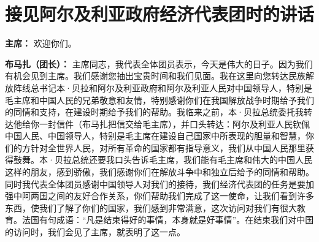 \section[接见阿尔及利亚政府经济代表团时的讲话（一九六四年九月二十日）]{接见阿尔及利亚政府经济代表团时的讲话}

\begin{list}{}{
    \setlength{\topsep}{0pt}        %
    \setlength{\partopsep}{0pt}     %
    \setlength{\parsep}{\parskip}   %
    \setlength{\itemsep}{\lineskip}       %
    \setlength{\labelsep}{0pt}%
    \setlength{\labelwidth}{3em}%
    \setlength{\itemindent}{0pt}%
    \setlength\listparindent{\parindent}
    \setlength{\leftmargin}{3em}
    \setlength{\rightmargin}{0pt}
    }

\item[\textbf{主席：}] 欢迎你们。

\item[\textbf{布马扎（团长）：}] 主席同志，我代表全体团员表示，今天是伟大的日子。因为我们有机会见到主席。我们感谢您抽出宝贵时间和我们见面。我在这里向您转达民族解放阵线总书记本·贝拉和阿尔及利亚政府和阿尔及利亚人民对中国领导人，特别是毛主席和中国人民的兄弟敬意和友情，特别感谢你们在我国解放战争时期给予我们的同情和支持，在建设时期给予我们的帮助。我临来之前，本·贝拉总统委托我转达他给你一封信件（布马扎把信交给毛主席），并口头转达：阿尔及利亚人民钦佩中国人民、中国领导人，特别是毛主席在建设自己国家中所表现的胆量和智慧，你们的方针对全世界人民，对所有革命的国家都有指导意义，我们从中国人民那里获得鼓舞。本·贝拉总统还要我口头告诉毛主席，我们能有毛主席和伟大的中国人民这样的朋友，感到骄傲，我们感谢你们在解放斗争中和独立后给予的同情和帮助。同时我代表全体团员感谢中国领导人对我们的接待，我们经济代表团的任务是要加强中阿两国之间的友好合作关系，你们帮助我们完成了这一使命，让我们看到许多东西，使我们了解了你们的国家，我们感到非常满意，这次访问对我们有很大教育。法国有句成语：“凡是结束得好的事情，本身就是好事情”。在结束我们对中国的访问时，我们会见了主席，就表明了这一点。


\end{list}

